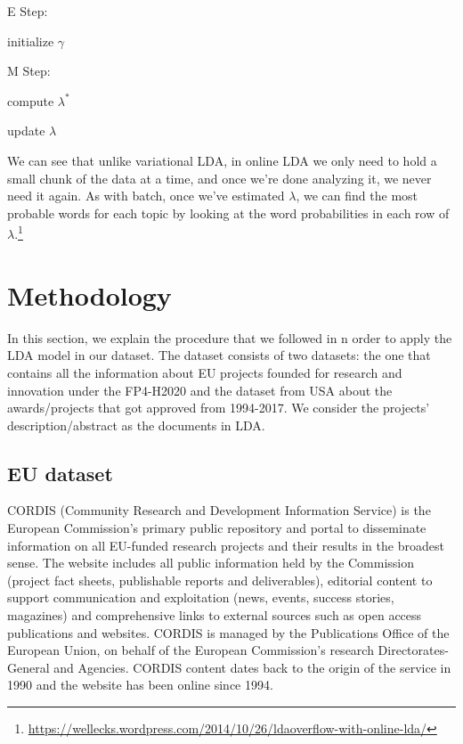 \documentclass[12pt]{report}
\begin{document}
\begin{algorithm}
\SetAlgoNoLine
E Step:

initialize $\gamma$

M Step:

compute $\lambda^{*}$

update $\lambda$
\end{algorithm}

We can see that unlike variational LDA, in online LDA we only need to hold a
small chunk of the data at a time, and once we’re done analyzing it, we never
need it again. As with batch, once we’ve estimated $\lambda$, we can find the 
most probable words for each topic by looking at the word probabilities in 
each row of $\lambda$.\footnote{\url{https://wellecks.wordpress.com/2014/10/26/ldaoverflow-with-online-lda/}}

\section{Methodology}

In this section, we explain the procedure that we followed in n order to apply
the LDA model in our dataset. The dataset consists of two datasets: the one that
contains all the information about EU projects founded for research and
innovation under the FP4-H2020 and the dataset from USA about the
awards/projects that got approved from 1994-2017. We consider the projects'
description/abstract as the documents in LDA. 

\subsection{EU dataset}

CORDIS (Community Research and Development Information Service) is the European
Commission's primary public repository and portal to disseminate information on
all EU-funded research projects and their results in the broadest sense. The
website includes all public information held by the Commission (project
fact sheets, publishable reports and deliverables), editorial content to support
communication and exploitation (news, events, success stories, magazines) and
comprehensive links to external sources such as open access publications and
websites. CORDIS is managed by the Publications Office of the European Union, on
behalf of the European Commission's research Directorates-General and Agencies.
CORDIS content dates back to the origin of the service in 1990 and the website
has been online since 1994.
\end{document}

